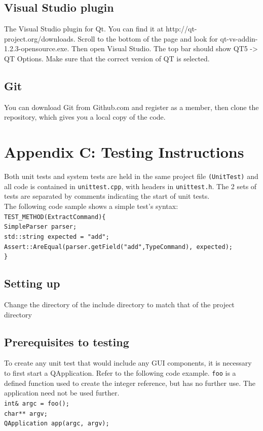 \documentclass[12pt]{extarticle}
\begin{document}
\subsection{Visual Studio plugin}
The Visual Studio plugin for Qt. You can find it at http://qt-project.org/downloads. 
Scroll to the bottom of the page and look for qt-vs-addin-1.2.3-opensource.exe. 
Then open Visual Studio. The top bar should show QT5 -> QT Options. Make 
sure that the correct version of QT is selected. 
\subsection{Git}
You can download Git from Github.com and register as a member, then clone the repository, which gives you a local copy of the code.

\section{Appendix C: Testing Instructions}
Both unit tests and system tests are held in the same project file \texttt{(UnitTest)} and all code is contained in \texttt{unittest.cpp}, with headers in \texttt{unittest.h}. The 2 sets of tests are separated by comments indicating the start of unit tests.\\
The following code sample shows a simple test's syntax:\\
\texttt{TEST\_METHOD(ExtractCommand)\{\\
\indent SimpleParser parser;\\
\indent std::string expected = "add";\\
\indent Assert::AreEqual(parser.getField("add",TypeCommand), expected);\\
        \}}
\subsection{Setting up}
Change the directory of the include directory to match that of the project directory
\subsection{Prerequisites to testing}
To create any unit test that would include any GUI components, it is necessary to first start a QApplication. Refer to the following code example. \texttt{foo} is a defined function used to create the integer reference, but has no further use. The application need not be used further.\\
\texttt{int\& argc = foo();\\
char** argv;\\
QApplication app(argc, argv);
}
\end{document}
